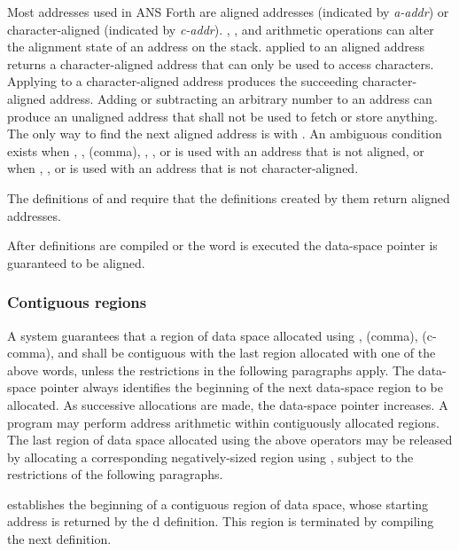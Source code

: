 Most addresses used in ANS Forth are aligned addresses (indicated
by \emph{a-addr}) or character-aligned (indicated by \emph{c-addr}).
, , and arithmetic operations can alter
the alignment state of an address on the stack.  applied
to an aligned address returns a character-aligned address that can
only be used to access characters. Applying  to a
character-aligned address produces the succeeding character-aligned
address. Adding or subtracting an arbitrary number to an address can
produce an unaligned address that shall not be used to fetch or
store anything. The only way to find the next aligned address is
with . An ambiguous condition exists when
, \word{!}, \word{,} (comma), \word{+!}, , or
 is used with an address that is not aligned, or when
, , or  is used with an address that is
not character-aligned.

The definitions of  and
 require that the definitions created
by them return aligned addresses.

After definitions are compiled or the word  is executed
the data-space pointer is guaranteed to be aligned.

\subsubsection{Contiguous regions} %
\label{usage:contiguous}

A system guarantees that a region of data space allocated using
, \word{,} (comma),  (c-comma), and
 shall be contiguous with the last region allocated
with one of the above words, unless the restrictions in the
following paragraphs apply. The data-space pointer 
always identifies the beginning of the next data-space region to be
allocated. As successive allocations are made, the data-space
pointer increases. A program may perform address arithmetic within
contiguously allocated regions. The last region of data space
allocated using the above operators may be released by allocating a
corresponding negatively-sized region using , subject
to the restrictions of the following paragraphs.

 establishes the beginning of a contiguous region of
data space, whose starting address is returned by the d
definition. This region is terminated by compiling the next
definition.

